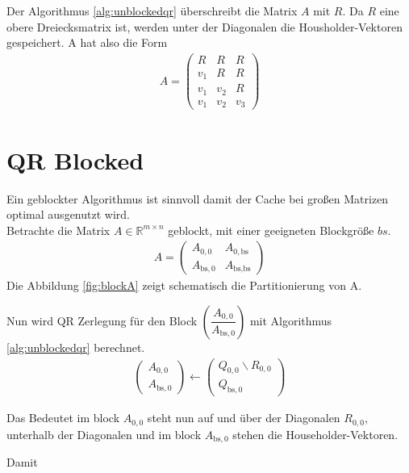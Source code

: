 Der Algorithmus \ref{alg:unblockedqr} überschreibt die Matrix $A$ mit $R$. Da $R$ eine obere Dreiecksmatrix ist, werden unter der Diagonalen die Housholder-Vektoren gespeichert. A hat also die Form
\begin{align*}
	A = 
	\left(\begin{array}{ccc}
	R   &  R  & R \\ 
	v_1 &  R  & R \\ 
	v_1 & v_2 & R \\ 
	v_1 & v_2 & v_3
	\end{array} \right)
\end{align*}


\section{QR Blocked}
Ein geblockter Algorithmus ist sinnvoll damit der Cache bei großen Matrizen optimal ausgenutzt wird. \\


Betrachte die Matrix $A \in \mathbb{R}^{m \times n}$ geblockt, mit einer geeigneten Blockgröße $bs$.
\begin{align}
	A = \left(\begin{array}{l|l}
	A_{0, 0} & A_{0, \text{bs}} \\ \hline
	A_{\text{bs}, 0}   & A_{\text{bs}, \text{bs}} 	
	\end{array} \right) \label{equ:blockA}
\end{align}
Die Abbildung \ref{fig:blockA} zeigt schematisch die Partitionierung von A.

Nun wird QR Zerlegung für den Block $ \left(\dfrac{A_{0, 0}}{A_{\text{bs}, 0}} \right)$
mit Algorithmus \ref{alg:unblockedqr} berechnet.
\begin{align}
	\left(\begin{array}{l} 
	A_{0, 0} \\ \hline
	A_{\text{bs}, 0}
	\end{array}\right)
	\leftarrow
	\left(\begin{array}{l} 
	Q_{0, 0}  \backslash R_{0,0} \\ \hline
	Q_{\text{bs}, 0} 
	\end{array}\right)
\end{align}

Das Bedeutet im block $A_{0, 0}$ steht nun auf und über der Diagonalen $R_{0,0}$, unterhalb der Diagonalen und im block $A_{\text{bs}, 0}$ stehen die Householder-Vektoren.

Damit 



